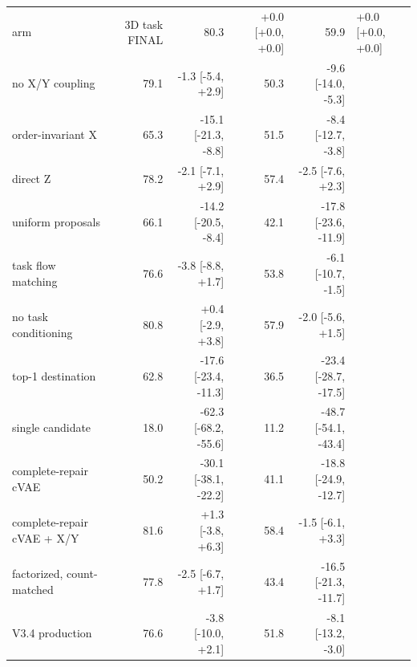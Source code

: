 \begin{tabular}{lrrrr}
\toprule
arm & 3D task %
\midrule
FINAL & 80.3 & +0.0 [+0.0, +0.0] & 59.9 & +0.0 [+0.0, +0.0] \\
no X/Y coupling & 79.1 & -1.3 [-5.4, +2.9] & 50.3 & -9.6 [-14.0, -5.3] \\
order-invariant X & 65.3 & -15.1 [-21.3, -8.8] & 51.5 & -8.4 [-12.7, -3.8] \\
direct Z & 78.2 & -2.1 [-7.1, +2.9] & 57.4 & -2.5 [-7.6, +2.3] \\
uniform proposals & 66.1 & -14.2 [-20.5, -8.4] & 42.1 & -17.8 [-23.6, -11.9] \\
task flow matching & 76.6 & -3.8 [-8.8, +1.7] & 53.8 & -6.1 [-10.7, -1.5] \\
no task conditioning & 80.8 & +0.4 [-2.9, +3.8] & 57.9 & -2.0 [-5.6, +1.5] \\
top-1 destination & 62.8 & -17.6 [-23.4, -11.3] & 36.5 & -23.4 [-28.7, -17.5] \\
single candidate & 18.0 & -62.3 [-68.2, -55.6] & 11.2 & -48.7 [-54.1, -43.4] \\
complete-repair cVAE & 50.2 & -30.1 [-38.1, -22.2] & 41.1 & -18.8 [-24.9, -12.7] \\
complete-repair cVAE + X/Y & 81.6 & +1.3 [-3.8, +6.3] & 58.4 & -1.5 [-6.1, +3.3] \\
factorized, count-matched & 77.8 & -2.5 [-6.7, +1.7] & 43.4 & -16.5 [-21.3, -11.7] \\
V3.4 production & 76.6 & -3.8 [-10.0, +2.1] & 51.8 & -8.1 [-13.2, -3.0] \\
\bottomrule
\end{tabular}

